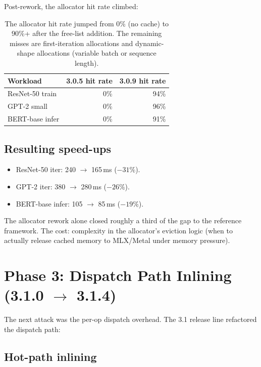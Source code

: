 Post-rework, the allocator hit rate climbed:

\begin{table}[t]
\centering
\small
\begin{tabular}{lrr}
\toprule
Workload & 3.0.5 hit rate & 3.0.9 hit rate \\
\midrule
ResNet-50 train  & 0\%   & 94\% \\
GPT-2 small      & 0\%   & 96\% \\
BERT-base infer  & 0\%   & 91\% \\
\bottomrule
\end{tabular}
\caption[Allocator hit rates after the free-list rework.]{The
allocator hit rate jumped from 0\% (no cache) to 90\%+ after
the free-list addition. The remaining misses are first-iteration
allocations and dynamic-shape allocations (variable batch or
sequence length).}
\label{tab:stabilization:hit_rates}
\end{table}

\subsection{Resulting speed-ups}
\label{ssec:stabilization:phase_2_speedups}

\begin{itemize}
  \item ResNet-50 iter: 240 $\to$ 165\,ms ($-31\%$).
  \item GPT-2 iter: 380 $\to$ 280\,ms ($-26\%$).
  \item BERT-base infer: 105 $\to$ 85\,ms ($-19\%$).
\end{itemize}

The allocator rework alone closed roughly a third of the gap to
the reference framework. The cost: complexity in the allocator's
eviction logic (when to actually release cached memory to
MLX/Metal under memory pressure).

\section{Phase 3: Dispatch Path Inlining (3.1.0 $\to$ 3.1.4)}
\label{sec:stabilization:phase_3}

The next attack was the per-op dispatch overhead. The 3.1
release line refactored the dispatch path:

\subsection{Hot-path inlining}
\label{ssec:stabilization:hot_path_inlining}

